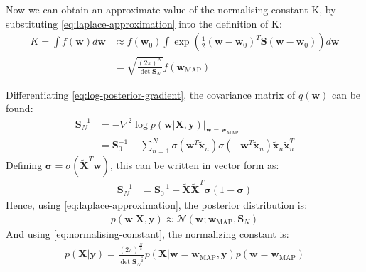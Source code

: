 \documentclass[a4paper]{article}
\begin{document}
    Now we can obtain an approximate value of the normalising constant K, by substituting \autoref{eq:laplace-approximation} into the definition of K:
    \begin{align}
        K = \int f(\bm{w}) d\bm{w} &\approx f(\bm{w}_0) \int \exp \left(\frac{1}{2} (\bm{w} - \bm{w}_0)^T \bm{S} (\bm{w} - \bm{w}_0) \right) d\bm{w} \nonumber \\
        &= \sqrt{\frac{(2\pi)^N}{\det \bm{S}_N}} f(\bm{w}_\text{MAP})
        \label{eq:normalising-constant}
    \end{align}

    Differentiating \autoref{eq:log-posterior-gradient}, the covariance matrix of $q(\bm{w})$ can be found:
    \begin{align}
        \bm{S}_N^{-1} &= -\nabla^2 \log p(\bm{w} | \bm{X}, \bm{y}) \big|_{\bm{w} = \bm{w}_{\text{MAP}}} \nonumber \\
        &= \bm{S}_0^{-1}
        + \sum_{n=1}^N \sigma(\bm{w}^T \tilde{\bm{x}}_n) \sigma(-\bm{w}^T \tilde{\bm{x}}_n)\tilde{\bm{x}}_n\tilde{\bm{x}}_n^T
    \end{align}
    Defining $\bm{\sigma} = \sigma(\tilde{\bm{X}}^T \bm{w})$, this can be written in vector form as:
    \begin{align}
         \bm{S}_N^{-1} &= \bm{S}_0^{-1} + \tilde{\bm{X}}\tilde{\bm{X}}^T \bm{\sigma} (1 - \bm{\sigma})
    \end{align}
    Hence, using \autoref{eq:laplace-approximation}, the posterior distribution is:
    \begin{align}
        p(\bm{w} | \bm{X}, \bm{y}) \approx \mathcal{N}(\bm{w}; \bm{w}_\text{MAP}, \bm{S}_N)
    \end{align}
    And using \autoref{eq:normalising-constant}, the normalizing constant is:
    \begin{align}
        p(\bm{X} | \bm{y}) = \frac{(2\pi)^\frac{N}{2}}{\det \bm{S}_N^{-\frac{1}{2}}}
                            p(\bm{X} | \bm{w} = \bm{w}_\text{MAP}, \bm{y}) p(\bm{w} = \bm{w}_\text{MAP})
    \end{align}
\end{document}
